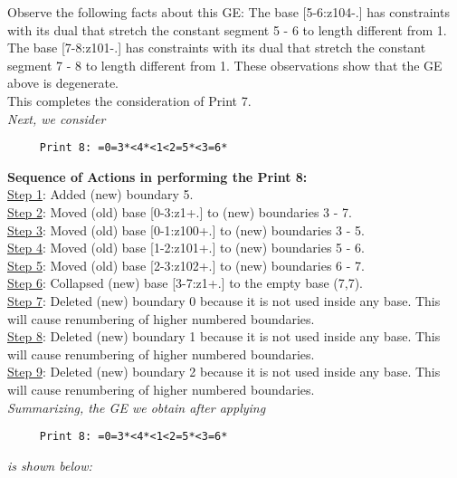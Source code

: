 \documentclass[final]{article}
\begin{document}
Observe the following facts about this GE:
The base [5-6:z104-.]  has constraints with its dual that stretch the constant segment 5 - 6 to length different from 1.  The base [7-8:z101-.]  has constraints with its dual that stretch the constant segment 7 - 8 to length different from 1.  These observations show that the GE above is degenerate.\\[0.1in]
This completes the consideration of Print 7.\\[0.1in]
{\em Next, we consider}
\begin{verbatim}
     Print 8: =0=3*<4*<1<2=5*<3=6*
\end{verbatim}
{\bf Sequence of Actions in performing the Print 8:}\\
{\underline{Step 1}:} Added (new) boundary 5.\\
{\underline{Step 2}:} Moved (old) base [0-3:z1+.]  to (new) boundaries 3 - 7.\\
{\underline{Step 3}:} Moved (old) base [0-1:z100+.]  to (new) boundaries 3 - 5.\\
{\underline{Step 4}:} Moved (old) base [1-2:z101+.]  to (new) boundaries 5 - 6.\\
{\underline{Step 5}:} Moved (old) base [2-3:z102+.]  to (new) boundaries 6 - 7.\\
{\underline{Step 6}:} Collapsed (new) base [3-7:z1+.]  to the empty base (7,7).
\\
{\underline{Step 7}:} Deleted (new) boundary 0 because it is not used inside any base.  This will cause renumbering of higher numbered boundaries.
\\
{\underline{Step 8}:} Deleted (new) boundary 1 because it is not used inside any base.  This will cause renumbering of higher numbered boundaries.
\\
{\underline{Step 9}:} Deleted (new) boundary 2 because it is not used inside any base.  This will cause renumbering of higher numbered boundaries.
\\[0.1in]
{\em Summarizing, the GE we obtain after applying}
\begin{verbatim}
     Print 8: =0=3*<4*<1<2=5*<3=6*
\end{verbatim}
{\em is shown below:}
\end{document}
